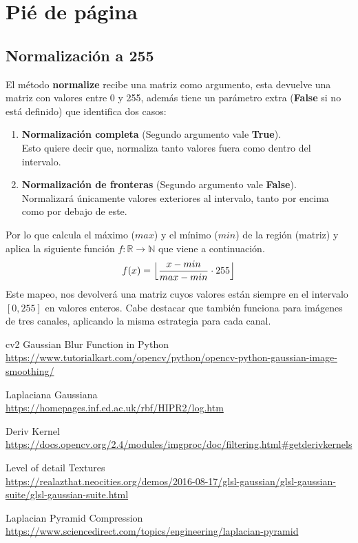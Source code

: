 \documentclass{article}
\begin{document}
\section{Pié de página}

\subsection{Normalización a 255}
El método \textbf{normalize} recibe una matriz como argumento, esta devuelve una matriz con valores entre 0 y 255, además tiene un parámetro extra (\textbf{False} si no está definido) que identifica dos casos:
\begin{enumerate}
	\item \textbf{Normalización completa} (Segundo argumento vale \textbf{True}).\\ Esto quiere decir que, normaliza tanto valores fuera como dentro del intervalo.
	\item \textbf{Normalización de fronteras} (Segundo argumento vale \textbf{False}). \\ Normalizará únicamente valores exteriores al intervalo, tanto por encima como por debajo de este.
\end{enumerate}
Por lo que calcula el máximo ($max$) y el mínimo ($min$) de la región (matriz) y aplica la siguiente función $f:\mathbb{R} \to \mathbb{N}$ que viene a continuación.
$$ f(x) = \Bigl\lfloor\dfrac{x - min}{max - min} \cdot 255\Bigr\rfloor$$
Este mapeo, nos devolverá una matriz cuyos valores están siempre en el intervalo $\left[0, 255\right]$ en valores enteros.
Cabe destacar que también funciona para imágenes de tres canales, aplicando la misma estrategia para cada canal.

\newpage

\begin{thebibliography}{9}
	cv2 Gaussian Blur Function in Python \\
	\url{https://www.tutorialkart.com/opencv/python/opencv-python-gaussian-image-smoothing/}
	
	Laplaciana Gaussiana\\
	\url{https://homepages.inf.ed.ac.uk/rbf/HIPR2/log.htm}
	
	Deriv Kernel \\
	\url{https://docs.opencv.org/2.4/modules/imgproc/doc/filtering.html#getderivkernels}
	
	Level of detail Textures \\
	\url{https://realazthat.neocities.org/demos/2016-08-17/glsl-gaussian/glsl-gaussian-suite/glsl-gaussian-suite.html}
	
	Laplacian Pyramid Compression \\
	\url{https://www.sciencedirect.com/topics/engineering/laplacian-pyramid}
	
\end{thebibliography}
\end{document}
